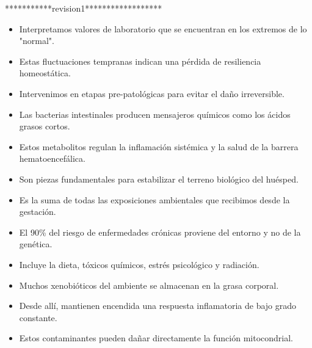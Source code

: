   ***********revision1******************

        \begin{itemize}
            \item Interpretamos valores de laboratorio que se encuentran en los extremos de lo "normal".
            \item Estas fluctuaciones tempranas indican una pérdida de resiliencia homeostática.
            \item Intervenimos en etapas pre-patológicas para evitar el daño irreversible.
        \end{itemize}

        \begin{itemize}
            \item Las bacterias intestinales producen mensajeros químicos como los ácidos grasos cortos.
            \item Estos metabolitos regulan la inflamación sistémica y la salud de la barrera hematoencefálica.
            \item Son piezas fundamentales para estabilizar el terreno biológico del huésped.
        \end{itemize}

       
        \begin{itemize}
            \item Es la suma de todas las exposiciones ambientales que recibimos desde la gestación.
            \item El 90\% del riesgo de enfermedades crónicas proviene del entorno y no de la genética.
            \item Incluye la dieta, tóxicos químicos, estrés psicológico y radiación.
        \end{itemize}

        \begin{itemize}
            \item Muchos xenobióticos del ambiente se almacenan en la grasa corporal.
            \item Desde allí, mantienen encendida una respuesta inflamatoria de bajo grado constante.
            \item Estos contaminantes pueden dañar directamente la función mitocondrial.
        \end{itemize}

